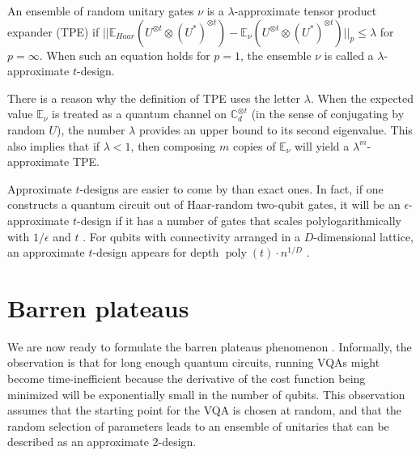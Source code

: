 \begin{definition}
    An ensemble of random unitary gates $\nu$ is a $\lambda$-approximate tensor product expander (TPE) if $||\mathbb{E}_{Haar} (U^{\otimes t} \otimes (U^*)^{\otimes t}) - \mathbb{E}_\nu (U^{\otimes t} \otimes (U^*)^{\otimes t}) ||_p \leq \lambda$ for $p=\infty$. When such an equation holds for $p=1$, the ensemble $\nu$ is called a $\lambda$-approximate $t$-design.
\end{definition}


\begin{remark}
    There is a reason why the definition of TPE uses the letter $\lambda$. When the expected value $\mathbb{E}_\nu$ is treated as a quantum channel on $\mathbb{C}_d^{\otimes t}$ (in the sense of conjugating by random $U$), the number $\lambda$ provides an upper bound to its second eigenvalue. This also implies that if $\lambda < 1$, then composing $m$ copies of $\mathbb{E}_\nu$ will yield a $\lambda^m$-approximate TPE.
\end{remark}

Approximate $t$-designs are easier to come by than exact ones. In fact, if one constructs a quantum circuit out of Haar-random two-qubit gates, it will be an $\epsilon$-approximate $t$-design if it has a number of gates that scales polylogarithmically with $1/\epsilon$ and $t$ \cite{brandao_local_2016}. For qubits with connectivity arranged in a $D$-dimensional lattice, an approximate $t$-design appears for depth $\operatorname{poly}(t) \cdot n^{1/D}$ \cite{harrow_approximate_2018}.

\section{Barren plateaus}

We are now ready to formulate the barren plateaus phenomenon \cite{mcclean_barren_2018}. Informally, the observation is that for long enough quantum circuits, running VQAs might become time-inefficient because the derivative of the cost function being minimized will be exponentially small in the number of qubits. This observation assumes that the starting point for the VQA is chosen at random, and that the random selection of parameters leads to an ensemble of unitaries that can be described as an approximate 2-design.

